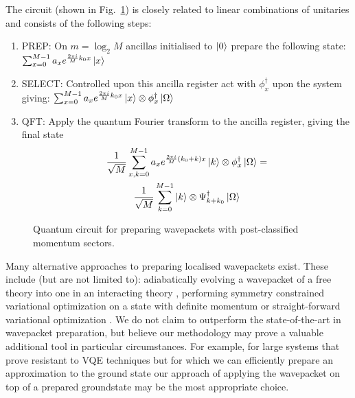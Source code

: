 \documentclass[aps,floatfix,10pt,amssymb,amsfont,amsmath,superscriptaddress,float,nofootinbib,longbibliography,nobalancelastpage,twocolumn]{revtex4-2}
\begin{document}
The circuit (shown in Fig.~\ref{fig:qcircuit}) is closely related to linear combinations of unitaries \cite{childs2012hamiltonian, berry2015simulating, babbush2018encoding} and consists of the following steps:
\begin{enumerate}
    \item \textsc{PREP}: On $m = \log_2 M$ ancillas initialised to $\ket{0}$ prepare the following state: $
            \sum_{x=0}^{M-1} a_xe^{\frac{2\pi i}{M}k_0x} \ket{x}$
    \item \textsc{SELECT}: Controlled upon this ancilla register act with $\phi^{\dagger}_x$ upon the system giving:
    $\sum_{x=0}^{M-1} a_xe^{\frac{2\pi i}{M}k_0x} \ket{x}\otimes \phi^{\dagger}_x\ket{\Omega}
    $
    \item \textsc{QFT}: Apply the quantum Fourier transform to the ancilla register, giving the final state
    \begin{multline}
       \frac{1}{\sqrt{M}} \sum_{x,k=0}^{M-1} a_xe^{\frac{2\pi i}{M}(k_0+k)x} \ket{k}\otimes \phi^{\dagger}_x\ket{\Omega} = \\\frac{1}{\sqrt{M}}\sum_{k=0}^{M-1}  \ket{k}\otimes \Psi^{\dagger}_{k+k_0}\ket{\Omega}
    \end{multline}
\end{enumerate}
\begin{figure}
    \centering
    \caption{Quantum circuit for preparing wavepackets with post-classified momentum sectors.}
    \label{fig:qcircuit}
\end{figure}
Many alternative approaches to preparing localised wavepackets exist. These include (but are not limited to): adiabatically evolving a wavepacket of a free theory into one in an interacting theory \cite{jordan2012quantum, jordan2011quantum, jordan2014quantum, brennen2014multi, barata2021single}, performing symmetry constrained variational optimization on a state with definite momentum \cite{farrell2026digital} or straight-forward variational optimization \cite{farrell2024quantum, davoudi2024scattering, zemlevskiy2025scalable}. We do not claim to outperform the state-of-the-art in wavepacket preparation, but believe our methodology may prove a valuable additional tool in particular circumstances. For example, for large systems that prove resistant to VQE techniques but for which we can efficiently prepare an approximation to the ground state our approach of applying the wavepacket on top of a prepared groundstate may be the most appropriate choice.
\end{document}
